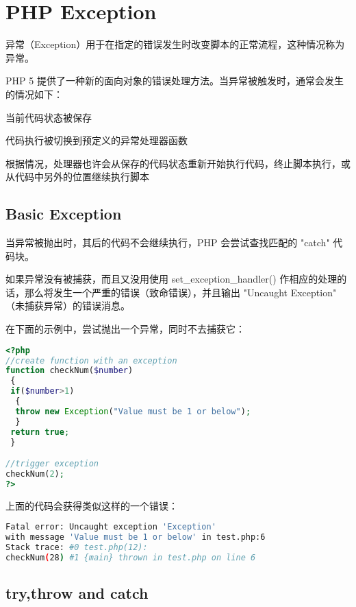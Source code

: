 \chapter{PHP Exception}

异常（Exception）用于在指定的错误发生时改变脚本的正常流程，这种情况称为异常。

PHP 5 提供了一种新的面向对象的错误处理方法。当异常被触发时，通常会发生的情况如下：

\begin{compactitem}
\item 当前代码状态被保存
\item 代码执行被切换到预定义的异常处理器函数
\item 根据情况，处理器也许会从保存的代码状态重新开始执行代码，终止脚本执行，或从代码中另外的位置继续执行脚本
\end{compactitem}




\section{Basic Exception}


当异常被抛出时，其后的代码不会继续执行，PHP 会尝试查找匹配的 "catch" 代码块。



如果异常没有被捕获，而且又没用使用 set\_exception\_handler() 作相应的处理的话，那么将发生一个严重的错误（致命错误），并且输出 "Uncaught Exception" （未捕获异常）的错误消息。


在下面的示例中，尝试抛出一个异常，同时不去捕获它：


\begin{lstlisting}[language=PHP]
<?php
//create function with an exception
function checkNum($number)
 {
 if($number>1)
  {
  throw new Exception("Value must be 1 or below");
  }
 return true;
 }

//trigger exception
checkNum(2);
?>
\end{lstlisting}

上面的代码会获得类似这样的一个错误：


\begin{lstlisting}[language=bash]
Fatal error: Uncaught exception 'Exception' 
with message 'Value must be 1 or below' in test.php:6 
Stack trace: #0 test.php(12): 
checkNum(28) #1 {main} thrown in test.php on line 6
\end{lstlisting}




\section{try,throw and catch}


